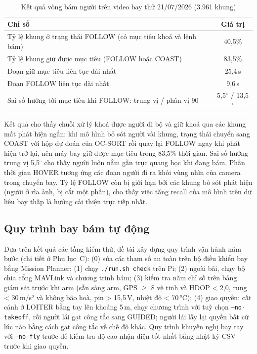 \begin{table}[H]
\centering
\caption{Kết quả vòng bám người trên video bay thử 21/07/2026 (3.961 khung)}
\label{tab:vongbam}
\small
\renewcommand{\arraystretch}{1.15}
\begin{tabular}{@{}lc@{}}
\toprule
\textbf{Chỉ số} & \textbf{Giá trị}\\
\midrule
Tỷ lệ khung ở trạng thái FOLLOW (có mục tiêu khoá và lệnh bám) & 40,5\%\\
Tỷ lệ khung giữ được mục tiêu (FOLLOW hoặc COAST) & 83,5\%\\
Đoạn giữ mục tiêu liên tục dài nhất & 25,4\,s\\
Đoạn FOLLOW liên tục dài nhất & 9,6\,s\\
Sai số hướng tới mục tiêu khi FOLLOW: trung vị / phân vị 90 & 5,5$^\circ$ / 13,5$^\circ$\\
\bottomrule
\end{tabular}
\end{table}

Kết quả cho thấy chuỗi xử lý khoá được người đi bộ và giữ khoá qua các khung mất phát hiện ngắn: khi mô hình bỏ sót người vài khung, trạng thái chuyển sang COAST với hộp dự đoán của OC-SORT rồi quay lại FOLLOW ngay khi phát hiện trở lại, nên máy bay giữ được mục tiêu trong 83,5\% thời gian. Sai số hướng trung vị 5,5$^\circ$ cho thấy người luôn nằm gần trục quang học khi đang bám. Phần thời gian HOVER tương ứng các đoạn người đi ra khỏi vùng nhìn của camera trong chuyến bay. Tỷ lệ FOLLOW còn bị giới hạn bởi các khung bỏ sót phát hiện (người ở rìa ảnh, bị cắt một phần), cho thấy việc tăng recall của mô hình trên dữ liệu bay thấp là hướng cải thiện trực tiếp nhất.

\subsection{Quy trình bay bám tự động}

Dựa trên kết quả các tầng kiểm thử, đề tài xây dựng quy trình vận hành năm bước (chi tiết ở Phụ lục~C): (0) sửa các tham số an toàn trên bộ điều khiển bay bằng Mission Planner; (1) chạy \texttt{./run.sh check} trên Pi; (2) ngoài bãi, chạy bộ chia cổng MAVLink và chương trình bám; (3) kiểm tra năm chỉ số trên bảng giám sát trước khi arm (sẵn sàng arm, GPS $\ge$ 8 vệ tinh và HDOP < 2,0, rung < 30\,m/s² và không bão hoà, pin > 15,5\,V, nhiệt độ < 70\,°C); (4) giao quyền: cất cánh ở LOITER bằng tay lên khoảng 5\,m, chạy chương trình với tuỳ chọn \texttt{--no-takeoff}, rồi người lái gạt công tắc sang GUIDED; người lái lấy lại quyền bất cứ lúc nào bằng cách gạt công tắc về chế độ khác. Quy trình khuyến nghị bay tay với \texttt{--no-fly} trước để kiểm tra độ cao nhận diện tốt nhất bằng nhật ký CSV trước khi giao quyền.

